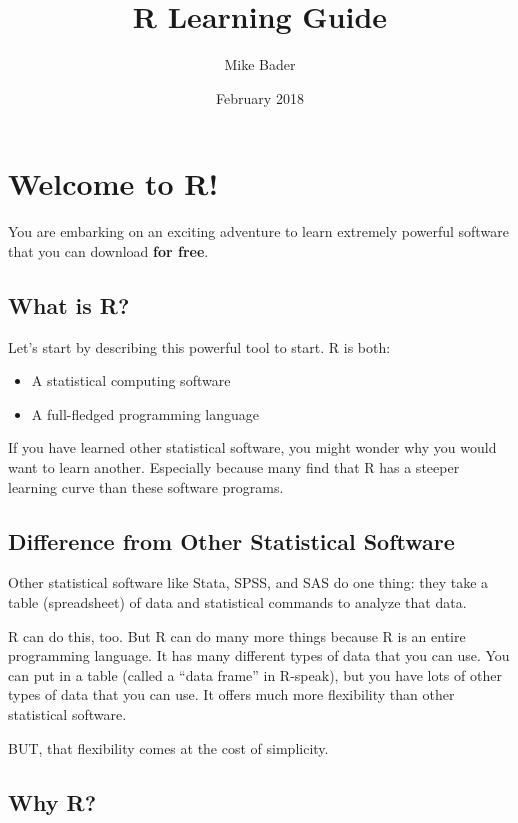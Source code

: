 \documentclass[]{article}
\title{R Learning Guide}
\author{Mike Bader}
\date{February 2018}
\begin{document}
\maketitle

{
\setcounter{tocdepth}{3}
\tableofcontents
}
\section{Welcome to R!}\label{welcome-to-r}

You are embarking on an exciting adventure to learn extremely powerful
software that you can download \textbf{for free}.

\subsection{What is R?}\label{what-is-r}

Let's start by describing this powerful tool to start. R is both:

\begin{itemize}
\item
  A statistical computing software
\item
  A full-fledged programming language
\end{itemize}

If you have learned other statistical software, you might wonder why you
would want to learn another. Especially because many find that R has a
steeper learning curve than these software programs.

\subsection{Difference from Other Statistical
Software}\label{difference-from-other-statistical-software}

Other statistical software like Stata, SPSS, and SAS do one thing: they
take a table (spreadsheet) of data and statistical commands to analyze
that data.

R can do this, too. But R can do many more things because R is an entire
programming language. It has many different types of data that you can
use. You can put in a table (called a ``data frame'' in R-speak), but
you have lots of other types of data that you can use. It offers much
more flexibility than other statistical software.

BUT, that flexibility comes at the cost of simplicity.

\subsection{Why R?}\label{why-r}
\end{document}
